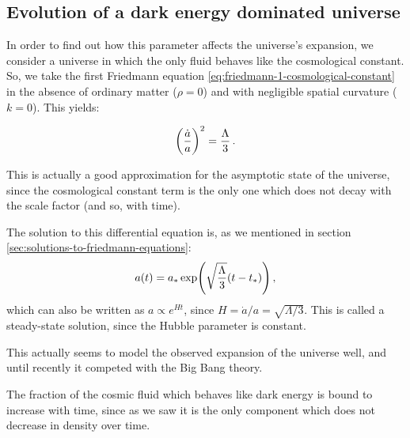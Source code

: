 \documentclass[main.tex]{subfiles}
\begin{document}

\subsection{Evolution of a dark energy dominated universe}

In order to find out how this parameter affects the universe's expansion, we consider a universe in which the only fluid behaves like the cosmological constant. 
So, we take the first Friedmann equation \eqref{eq:friedmann-1-cosmological-constant} in the absence of ordinary matter (\(\rho = 0\)) and with negligible spatial curvature (\(k= 0\)). This yields:

\begin{equation}
  \qty(\frac{\dot{a} }{a})^2 = \frac{\Lambda}{3}
\,.
\end{equation}

This is actually a good approximation for the asymptotic state of the universe, since the cosmological constant term is the only one which does not decay with the scale factor (and so, with time).

The solution to this differential equation is, as we mentioned in section \ref{sec:solutions-to-friedmann-equations}:
%
\begin{equation}
  a(t) = a_{*} \exp(\sqrt{\frac{\Lambda}{3}} \qty(t-t_{*})) 
\,,
\end{equation}
%
which can also be written as \(a \propto e^{Ht}\), since \(H = \dot{a} / a = \sqrt{\Lambda / 3}\).
This is called a steady-state solution, since the Hubble parameter is constant. 

This actually seems to model the observed expansion of the universe well, and until recently it competed with the Big Bang theory. 

The fraction of the cosmic fluid which behaves like dark energy is bound to increase with time, since as we saw it is the only component which does not decrease in density over time. 
\end{document}
